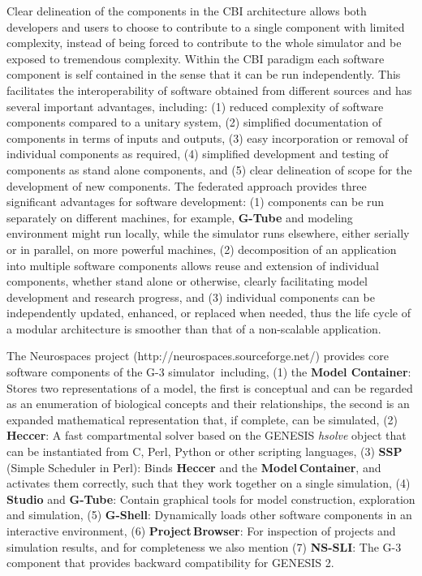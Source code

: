 \documentclass[12pt]{article}
\begin{document}
Clear delineation of the components in the CBI architecture allows both
developers and users to choose to contribute to a single component
with limited complexity, instead of being forced to contribute to the
whole simulator and be exposed to tremendous complexity. Within the
CBI paradigm each software component is self contained in the sense
that it can be run independently. This facilitates the
interoperability of software obtained from different sources and has
several important advantages, including: (1) reduced complexity of
software components compared to a unitary system, (2) simplified
documentation of components in terms of inputs and outputs, (3) easy
incorporation or removal of individual components as required, (4)
simplified development and testing of components as stand alone
components, and (5) clear delineation of scope for the development of new
components. The federated approach provides three significant advantages
for software development: (1) components can be run separately on
different machines, for example, {\bf G-Tube} and modeling environment
might run locally, while the simulator runs elsewhere, either serially
or in parallel, on more powerful machines, (2) decomposition of an
application into multiple software components allows reuse and
extension of individual components, whether stand alone or otherwise,
clearly facilitating model development and research progress, and (3)
individual components can be independently updated, enhanced, or
replaced when needed, thus the life cycle of a modular architecture is
smoother than that of a non-scalable application.

The Neurospaces project (http://neurospaces.sourceforge.net/) provides core software components of the G-3 simulator\,\cite{cornelis03:_neuros} including, (1) the
{\bf Model Container}: Stores two representations of a model, the
first is conceptual and can be regarded as an enumeration of
biological concepts and their relationships, the second is an expanded
mathematical representation that, if complete, can be simulated, (2)
{\bf Heccer}: A fast compartmental solver based on the GENESIS {\it
  hsolve} object that can be instantiated from C, Perl, Python or
other scripting languages, (3) {\bf SSP} (Simple Scheduler in Perl): Binds {\bf Heccer} and the {\bf Model\,Container}, and activates them correctly,
such that they work together on a single simulation, (4) {\bf Studio} and {\bf G-Tube}: Contain graphical tools
for model construction, exploration and simulation, (5) {\bf G-Shell}: Dynamically loads other software components in
an interactive environment, (6) {\bf Project\,Browser}: For inspection of projects and
simulation results, and for completeness we also mention (7) {\bf NS-SLI}: The G-3 component that provides backward compatibility for GENESIS 2.
\end{document}
